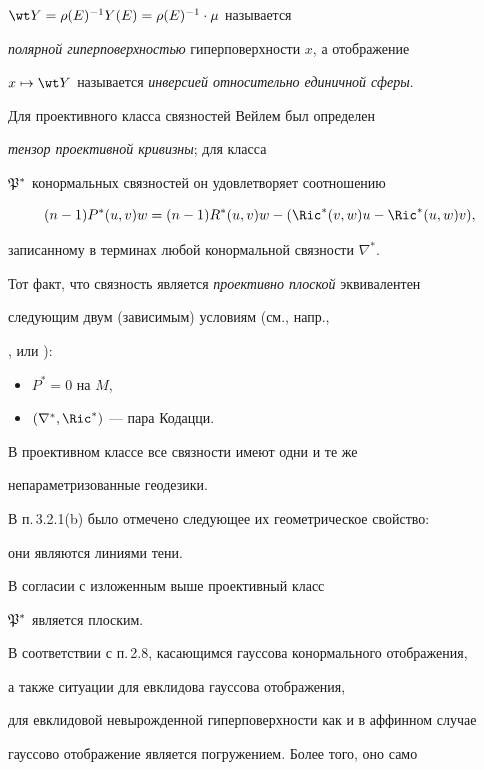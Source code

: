 $\wt Y = \rho(E)^{-1}Y(E)= \rho(E)^{-1} \cdot \mu $ называется

{\it полярной гиперповерхностью} гиперповерхности $x$, а отображение

$x \mapsto \wt Y $ называется {\it инверсией относительно единичной сферы}.



Для проективного класса связностей Вейлем был определен

{\it тензор проективной кривизны}; для класса

$\frak P^*$ конормальных связностей он удовлетворяет соотношению

$$

(n-1)P^*(u,v)w = (n-1)R^*(u,v)w - (\Ric^*(v,w)u - \Ric^*(u,w)v),

$$

записанному в терминах любой конормальной связности $\nabla ^*$.

Тот факт, что связность является {\it проективно плоской} эквивалентен

следующим двум (зависимым) условиям (см., напр.,

\cite{EIS}, \cite{SCHI} или \cite{SIM-S-V}):

\begin{itemize}

\item [(i)] $P^* = 0$ на $M$,

\item [(ii)] $(\nabla ^*, \Ric^*)$ --- пара Кодацци.

\end{itemize}

В проективном классе все связности имеют одни и те же

непараметризованные геодезики.

В п.\,3.2.1(b) было отмечено следующее их геометрическое свойство:

они являются линиями тени.

В согласии с изложенным выше проективный класс

$\frak P^*$ является плоским.

В соответствии с п.\,2.8, касающимся гауссова конормального отображения,

а также ситуации для евклидова гауссова отображения,

для евклидовой невырожденной гиперповерхности как и в аффинном случае 

гауссово отображение является погружением. Более того, оно само

